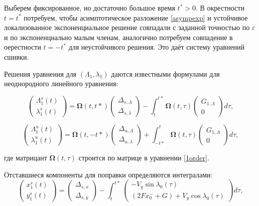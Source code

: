 Выберем фиксированное, но достаточно большое время $t^* > 0$. В окрестности $t = t^*$ потребуем, чтобы асимптотическое разложение \eqref{asympexp} и устойчивое локализованное экспоненциальное решение совпадали с заданной точностью по $\varepsilon$ и по экспоненциально малым членам, аналогично потребуем совпадение в оерестности $t = -t^*$ для неустойчивого решения. Это даёт систему уравнений сшивки.

Решения уравнения для $(\Lambda_1, \lambda_1)$ даются известными формулами для неоднородного линейного уравнения:

\begin{equation}
    \begin{pmatrix} \Lambda_1^s(t) \\ \lambda_1^s(t) \end{pmatrix}
    = \mathbf{\Omega}(t,t*) \begin{pmatrix} \Delta_{s,\Lambda} \\ \Delta_{s, \lambda} \end{pmatrix} - \int_{t}^{t*} \mathbf{\Omega}(t, \tau) \begin{pmatrix} G_{1, \Lambda} \\ 0 \end{pmatrix} d\tau,
    \label{fs1}
\end{equation}

\begin{equation}
    \begin{pmatrix} \Lambda_1^u(t) \\ \lambda_1^u(t) \end{pmatrix}
    = \mathbf{\Omega}(t,-t*) \begin{pmatrix} \Delta_{u,\Lambda} \\ \Delta_{u, \lambda} \end{pmatrix} + \int_{-t*}^{t} \mathbf{\Omega}(t, \tau) \begin{pmatrix} G_{1, \Lambda} \\ 0 \end{pmatrix} d\tau,
    \label{fu1}
\end{equation}

где матрицант $\mathbf{\Omega}(t, \tau)$ строится по матрице в уравнении \eqref{1order}.

Отставшиеся компоненты для поправки определяются интегралами:
\begin{equation}
    \begin{pmatrix} x_1^s(t) \\ y_1^s(t) \end{pmatrix}
    = 
    \begin{pmatrix} \Delta_{s,x} \\ \Delta_{s,y} \end{pmatrix}
    - \int_{t}^{t*} \begin{pmatrix} -V_y \sin \lambda_0(\tau) \\ (2F x_0^- + G) + V_y \cos \lambda_0(\tau) \end{pmatrix} d\tau,
    \label{ss1}
\end{equation}

